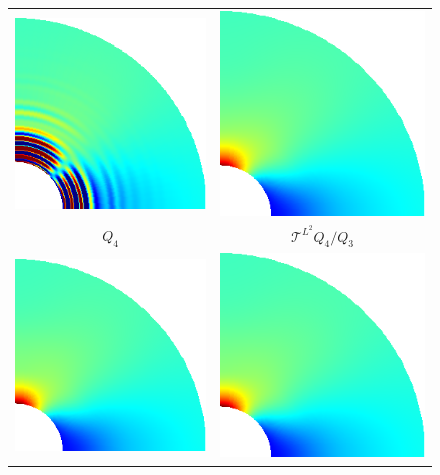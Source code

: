 \begin{figure}[htb!]
    \center
    \begin{tabular}{cc}
        \includegraphics[width=.4\linewidth]{no_stress_contour}        & \includegraphics[width=.4\linewidth]{g_stress_contour}  \\
        $Q_4$                                                          & $\mathcal{T}^{L^2} Q_4/Q_3$                             \\
        \includegraphics[width=.4\linewidth]{s_stress_contour}         & \includegraphics[width=.4\linewidth]{ns_stress_contour} \\

\end{tabular}
\end{figure}
